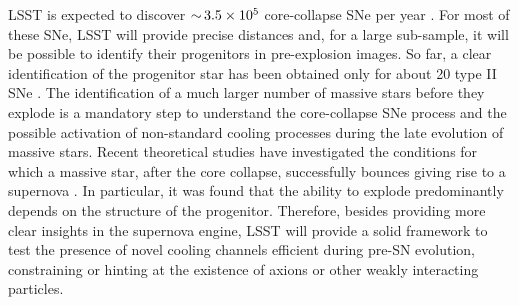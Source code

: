 LSST is expected to discover $ {\sim}\, 3.5\times10^5$ core-collapse SNe per year \citet{Lien:2009}. 
For most of these SNe, LSST will provide precise distances and, for a large sub-sample, it will be possible to identify their progenitors in pre-explosion images. 
So far, a clear identification of the progenitor star has been obtained only for about 20 type II SNe \citep{Smartt:2015}.  
The identification of a much larger number of massive stars before they explode is a mandatory step to understand the core-collapse SNe process and the possible activation of non-standard cooling processes during the late evolution of massive stars. 
Recent theoretical studies have investigated the conditions for which a massive star, after the core collapse, successfully bounces giving rise to a supernova \citep[e.g.,][and references therein]{OConnor:2011,Sukhbold:2016}.   
In particular, it was found that the ability to explode predominantly depends on the structure of the progenitor. 
Therefore, besides providing more clear insights in the supernova engine, LSST will provide a solid framework to test the presence of novel cooling channels efficient during pre-SN evolution, constraining or hinting at the existence of axions or other weakly interacting particles. 



%
%

